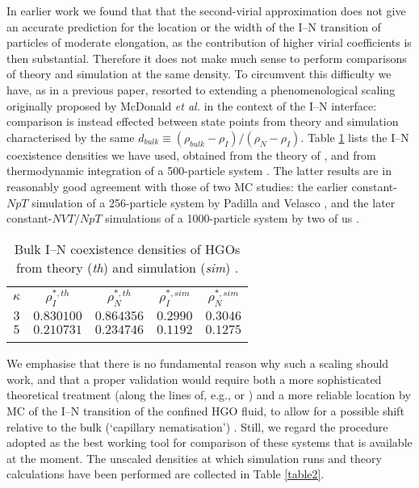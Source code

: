 \documentclass[aps,pre,twocolumn,groupedaddress,showpacs]{revtex4}
\newlength{\htab}
\newcommand{\hsp}{\hspace*{\htab}}
\begin{document}
In earlier work \cite{Chrzanowska:2001} we found that that the second-virial 
approximation does not give an accurate prediction for the location or the 
width of the I--N transition of particles of moderate 
elongation, as the contribution of higher virial coefficients is then
substantial. Therefore it does not make much sense to perform comparisons 
of theory and simulation at the same density. To circumvent this difficulty 
we have, as in a previous paper, resorted to extending a phenomenological 
scaling originally proposed by McDonald {\it et al.} \cite{Friederike:2000}
in the context of the I--N interface: comparison is instead effected 
between state points from theory and simulation characterised by the same 
$d_{bulk}\equiv (\rho_{bulk}-\rho_I)/(\rho_N-\rho_I)$. Table \ref{table1}
lists the I--N coexistence densities we have used, obtained from the theory 
of \cite{Chrzanowska:2001}, and from thermodynamic integration of a 
500-particle system \cite{deMiguel:2001}. The latter results are in reasonably 
good agreement with those of two MC studies: the earlier constant-$NpT$ 
simulation of a 256-particle system by Padilla and Velasco \cite{Kike:1997}, 
and the later constant-$NVT/NpT$ simulations of a 1000-particle system by 
two of us \cite{Barmes:2003}.\\

\begin{table}
\begin{center}
\begin{tabular}{||ccccc||}
	\hhline{|t:=====:t|}
	$\kappa$	&$\rho^{*,th}_I$ & $\rho^{*,th}_N$ &$\rho^{*,sim}_I$   &$\rho^{*,sim}_N$\\
	\hhline{||-----||}
	\hsp$3$\hsp	&\hsp$0.830100$\hsp	&\hsp$0.864356$\hsp	&\hsp$0.2990$\hsp	&\hsp$0.3046$\hsp\\
	\hhline{||-----||}
	$5$		&$0.210731$		&$0.234746$		&$0.1192$		&$0.1275$ \\
	\hhline{|b:=====:b|}
	\end{tabular}
\end{center}

\caption{Bulk I--N coexistence densities of HGOs from theory ({\it th}) 
\protect\cite{Chrzanowska:2001} and simulation ({\it sim}) 
\protect\cite{deMiguel:2001}.}
\label{table1} 
\end{table}

We emphasise that there is no fundamental 
reason why such a scaling should work, and that a proper validation would
require both a more sophisticated theoretical treatment (along the lines
of, e.g., \cite{Somoza:1989} or \cite{Friederike:2002}) and a more reliable 
location by MC of the I--N transition of the confined HGO fluid, to allow 
for a possible shift relative to the bulk (`capillary nematisation') 
\cite{Sluckin:1987,VanRoij:1999,Barmes:2003}. Still, we regard the procedure 
adopted as the best working tool for comparison of these systems that is 
available at the moment. The unscaled densities at which simulation runs and 
theory calculations have been performed are collected in Table \ref{table2}.\\
\end{document}
